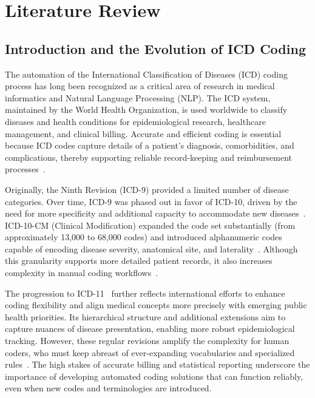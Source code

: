 \chapter{Literature Review}

\section{Introduction and the Evolution of ICD Coding}

The automation of the International Classification of Diseases (ICD) coding process has long been recognized as a critical area of research in medical informatics and Natural Language Processing (NLP). The ICD system, maintained by the World Health Organization, is used worldwide to classify diseases and health conditions for epidemiological research, healthcare management, and clinical billing. Accurate and efficient coding is essential because ICD codes capture details of a patient's diagnosis, comorbidities, and complications, thereby supporting reliable record-keeping and reimbursement processes~\citep{who2019icd11}.

Originally, the Ninth Revision (ICD-9) provided a limited number of disease categories. Over time, ICD-9 was phased out in favor of ICD-10, driven by the need for more specificity and additional capacity to accommodate new diseases~\citep{dong2022automated}. ICD-10-CM (Clinical Modification) expanded the code set substantially (from approximately 13,000 to 68,000 codes) and introduced alphanumeric codes capable of encoding disease severity, anatomical site, and laterality~\citep{edin2023automated}. Although this granularity supports more detailed patient records, it also increases complexity in manual coding workflows~\citep{farkas2008automatic}.

The progression to ICD-11~\citep{who2019icd11} further reflects international efforts to enhance coding flexibility and align medical concepts more precisely with emerging public health priorities. Its hierarchical structure and additional extensions aim to capture nuances of disease presentation, enabling more robust epidemiological tracking. However, these regular revisions amplify the complexity for human coders, who must keep abreast of ever-expanding vocabularies and specialized rules~\citep{scheurwegs2017data}. The high stakes of accurate billing and statistical reporting underscore the importance of developing automated coding solutions that can function reliably, even when new codes and terminologies are introduced.

